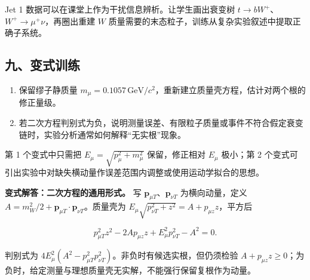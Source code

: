 \documentclass[12pt,a4paper,UTF8]{ctexart}
\newcommand{\tightlist}{\setlength{\itemsep}{0pt}\setlength{\parskip}{0pt}}
\begin{document}
Jet 1 数据可以在课堂上作为干扰信息辨析。让学生画出衰变树
\(t\to bW^+\)、\(W^+\to\mu^+\nu\)，再圈出重建 \(W\)
质量需要的末态粒子，训练从复杂实验叙述中提取正确子系统。

\subsection{九、变式训练}\label{ux4e5dux53d8ux5f0fux8badux7ec3-7}

\begin{enumerate}
\def\labelenumi{\arabic{enumi}.}
\tightlist
\item
  保留缪子静质量
  \(m_\mu=0.1057\,\mathrm{GeV}/c^2\)，重新建立质量壳方程，估计对两个根的修正量级。
\item
  若二次方程判别式为负，说明测量误差、有限粒子质量或事件不符合假定衰变链时，实验分析通常如何解释``无实根''现象。
\end{enumerate}

第 1 个变式中只需把 \(E_\mu=\sqrt{p_\mu^2+m_\mu^2}\) 保留，修正相对
\(E_\mu\) 极小；第 2
个变式可引出实验中对缺失横动量作误差范围内调整或使用运动学拟合的思想。

\textbf{变式解答：二次方程的通用形式。} 写
\(\boldsymbol p_{\mu T}\)、\(\boldsymbol p_{\nu T}\) 为横向动量，定义
\(A=m_W^2/2+\boldsymbol p_{\mu T}\cdot\boldsymbol p_{\nu T}\)。质量壳为
\(E_\mu\sqrt{p_{\nu T}^2+z^2}=A+p_{\mu z}z\)，平方后

\[p_{\mu T}^2z^2-2Ap_{\mu z}z+E_\mu^2p_{\nu T}^2-A^2=0.\]

判别式为
\(4E_\mu^2(A^2-p_{\mu T}^2p_{\nu T}^2)\)。非负时有候选实根，但仍须检验
\(A+p_{\mu z}z\ge0\)；为负时，给定测量与理想质量壳无实解，不能强行保留复根作为动量。
\end{document}
